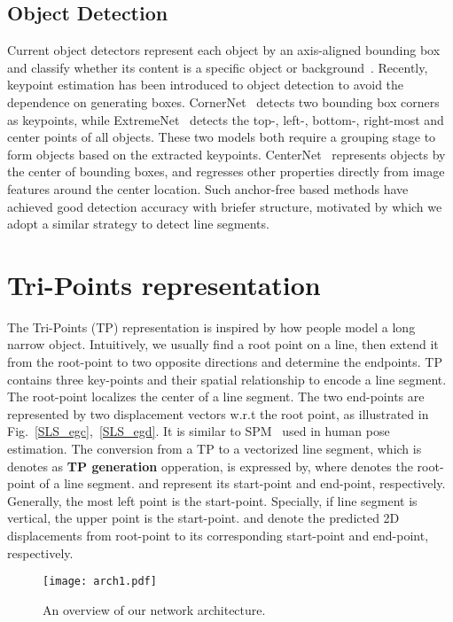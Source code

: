 \documentclass[runningheads]{llncs}
\begin{document}
\subsection{Object Detection}
 Current object detectors represent each object by an axis-aligned bounding box and classify whether its content is a specific object or background~\cite{FRcnn, SSD}. Recently, keypoint estimation has been introduced to object detection to avoid the dependence on generating boxes. CornerNet~\cite{CornerNet} detects two bounding box corners as keypoints, while ExtremeNet~\cite{ExtremeNet} detects the top-, left-, bottom-, right-most and center points of all objects. These two models both require a grouping stage to form objects based on the extracted keypoints. CenterNet~\cite{CenterNet} represents objects by the center of bounding boxes, and regresses other properties directly from image features around the center location. Such anchor-free based methods have achieved good detection accuracy with 
briefer structure, motivated by which we adopt a similar strategy to detect line segments.


\section{Tri-Points representation}
The Tri-Points (TP) representation is inspired by how people model a long narrow object. Intuitively, we usually find a root point on a line, then extend it from the root-point to two opposite directions and determine the endpoints. TP contains three key-points and their spatial relationship to encode a line segment. The root-point localizes the center of a line segment. The two end-points are represented by two displacement vectors w.r.t the root point, as illustrated in Fig.~\ref{SLS_egc},~\ref{SLS_egd}.
It is similar to SPM~\cite{SPM} used in human pose estimation.
The conversion from a TP to a vectorized line segment, which is denotes as \textbf{TP generation} opperation, is expressed by, 
where  denotes the root-point of a line segment.  and  represent its start-point and end-point, respectively. Generally, the most left point is the start-point. Specially, if line segment is vertical, the upper point is the start-point.  and  denote the predicted 2D displacements from root-point to its corresponding start-point and end-point, respectively.

\begin{figure}[t]
\centering
\texttt{[image: arch1.pdf]}
\caption{An overview of our network architecture.}
\label{arch}
\end{figure}
\end{document}
